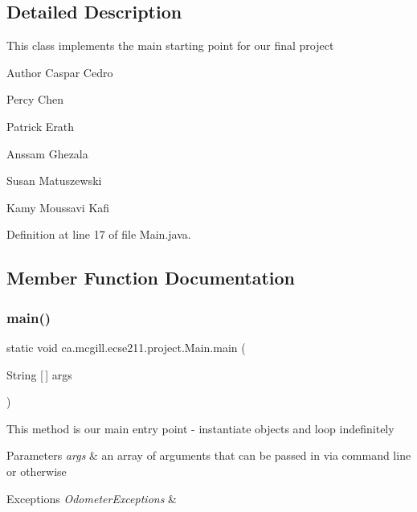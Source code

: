 \subsection{Detailed Description}
This class implements the main starting point for our final project

\begin{DoxyAuthor}{Author}
Caspar Cedro 

Percy Chen 

Patrick Erath 

Anssam Ghezala 

Susan Matuszewski 

Kamy Moussavi Kafi 
\end{DoxyAuthor}


Definition at line 17 of file Main.\+java.



\subsection{Member Function Documentation}
\mbox{\label{classca_1_1mcgill_1_1ecse211_1_1project_1_1_main_af681b5dc675c13ed284071cc135f5fd3}} 
\subsubsection{\texorpdfstring{main()}{main()}}
{\footnotesize\ttfamily static void ca.\+mcgill.\+ecse211.\+project.\+Main.\+main (\begin{DoxyParamCaption}\item[{String \mbox{[}$\,$\mbox{]}}]{args }\end{DoxyParamCaption})\hspace{0.3cm}{\ttfamily [static]}}

This method is our main entry point -\/ instantiate objects and loop indefinitely


\begin{DoxyParams}{Parameters}
{\em args} & an array of arguments that can be passed in via command line or otherwise \\
\hline
\end{DoxyParams}

\begin{DoxyExceptions}{Exceptions}
{\em Odometer\+Exceptions} & \\
\hline
\end{DoxyExceptions}


